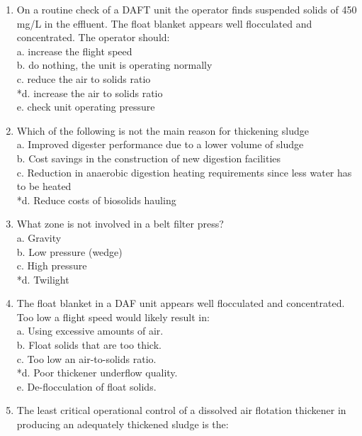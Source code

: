 \documentclass{article}
\begin{document}
\begin{enumerate}
\item  On a routine check of a DAFT unit the operator finds suspended solids of 450 mg/L in the effluent.  The float blanket appears well flocculated and concentrated. The operator should: \\

a. increase the flight speed \\
b. do nothing, the unit is operating normally \\
c. reduce the air to solids ratio \\
*d. increase the air to solids ratio \\
e. check unit operating pressure \\

\item  Which of the following is not the main reason for thickening sludge \\

a. Improved digester performance due to a lower volume of sludge \\
b. Cost savings in the construction of new digestion facilities \\
c. Reduction in anaerobic digestion heating requirements since less water has to be heated \\
*d. Reduce costs of biosolids hauling \\

\item  What zone is not involved in a belt filter press? \\

a. Gravity \\
b. Low pressure (wedge) \\
c. High pressure \\
*d. Twilight \\

\item  The float blanket in a DAF unit appears well flocculated and concentrated.  Too low a flight speed would likely result in: \\

a. Using excessive amounts of air. \\
b. Float solids that are too thick. \\
c. Too low an air-to-solids ratio. \\
*d. Poor thickener underflow quality. \\
e. De-flocculation of float solids. \\

\item  The least critical operational control of a dissolved air flotation thickener in producing an adequately thickened sludge is the: \\


\end{enumerate}
\end{document}
